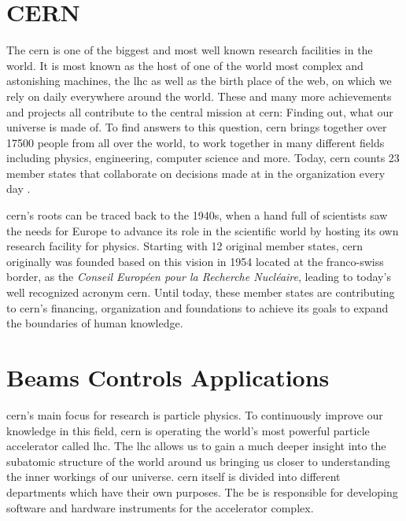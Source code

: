 \section{CERN}
\label{sec:Introduction:CERN}

The \gls{cern} is one of the biggest and most well known research facilities in
the world. It is most known as the host of one of the world most complex and
astonishing machines, the \gls{lhc} as well as the birth place of the \gls{web},
on which we rely on daily everywhere around the world. \cite{Cern} These and
many more achievements and projects all contribute to the central mission at
\gls{cern}: Finding out, what our universe is made of. To find answers to this
question, \gls{cern} brings together over 17500 people from all over the world,
to work together in many different fields including physics, engineering,
computer science and more. Today, \gls{cern} counts 23 member states that
collaborate on decisions made at in the organization every day
\cite{CernWhoWeAre}.

\gls{cern}'s roots can be traced back to the 1940s, when a hand full of
scientists saw the needs for Europe to advance its role in the scientific world
by hosting its own research facility for physics. Starting with 12 original
member states, \gls{cern} originally was founded based on this vision in 1954
located at the franco-swiss border, as the \emph{Conseil Européen pour la
Recherche Nucléaire}, leading to today's well recognized acronym \gls{cern}.
Until today, these member states are contributing to \gls{cern}'s financing,
organization and foundations to achieve its goals to expand the boundaries of
human knowledge. \cite{CernOurHistory}





\section{Beams Controls Applications}
\label{sec:Introduction:BE-CO-APS}

\gls{cern}'s main focus for research is particle physics. To continuously
improve our knowledge in this field, \gls{cern} is operating the world's most
powerful particle accelerator called \gls{lhc}. The \gls{lhc} allows us to gain
a much deeper insight into the subatomic structure of the world around us
bringing us closer to understanding the inner workings of our universe.
\gls{cern} itself is divided into different departments which have their own
purposes. The \gls{be} is responsible for developing software and hardware
instruments for the accelerator complex. \cite{CernBeamsDep}

